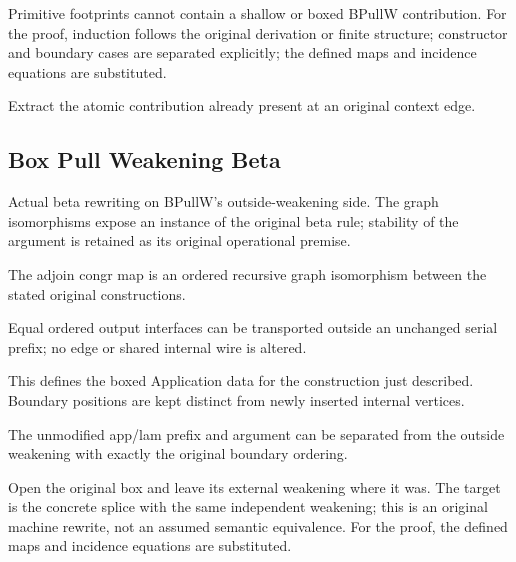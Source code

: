 Primitive footprints cannot contain a shallow or boxed BPullW contribution.
For the proof, induction follows the original derivation or finite structure; constructor and boundary cases are separated explicitly; the defined maps and incidence equations are substituted.
\par{}

Extract the atomic contribution already present at an original context edge.
\par{}

\subsection{Box Pull Weakening Beta}
Actual beta rewriting on BPullW's outside-weakening side. The graph isomorphisms expose an instance of the original beta rule; stability of the argument is retained as its original operational premise.

The adjoin congr map is an ordered recursive graph isomorphism between the stated original constructions.
\par{}

Equal ordered output interfaces can be transported outside an unchanged serial prefix; no edge or shared internal wire is altered.
\par{}

This defines the boxed Application data for the construction just described. Boundary positions are kept distinct from newly inserted internal vertices.
\par{}

The unmodified app/lam prefix and argument can be separated from the outside weakening with exactly the original boundary ordering.
\par{}

Open the original box and leave its external weakening where it was. The target is the concrete splice with the same independent weakening; this is an original machine rewrite, not an assumed semantic equivalence.
For the proof, the defined maps and incidence equations are substituted.
\par{}

